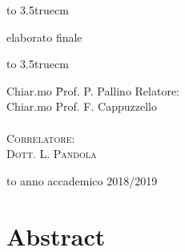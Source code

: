 \documentclass[10pt,foldmark]{leaflet}
\begin{document}
\begin{center}
\centerline{\hbox to 3.5truecm{\hrulefill}}
{\sc elaborato finale}\\
\centerline{\hbox to 3.5truecm{\hrulefill}}

\vfill

\begin{minipage}{\textwidth}
\begin{flushright}
\begin{minipage}{0.3\textwidth}
\begin{tabbing}
Chiar.mo \= Prof. P. Pallino \kill
Relatore: \> \\
Chiar.mo \> Prof. F. Cappuzzello \\
\\
\textsc{Correlatore:} \\
\textsc{Dott. L. Pandola}
\end{tabbing}
\end{minipage}
\end{flushright}
\end{minipage}

\vfill

\hbox to \textwidth{\hrulefill}
{\sc anno accademico 2018/2019}

\end{center}

\newpage

\section{Abstract}
\end{document}
